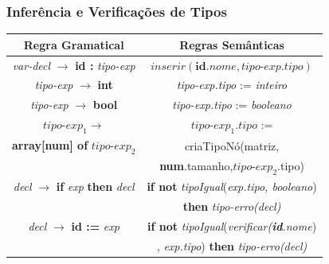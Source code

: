 \documentclass[table]{beamer}
\begin{document}
\begin{frame}
   \frametitle{Inferência e Verificações de Tipos}
   \begin{table}
      \begin{tabular}{c|c}
      \textbf{Regra Gramatical} & \textbf{Regras Semânticas} \\
      \hline
      \hline
      \textit{var-decl} $\to$ \textbf{id :} \textit{tipo-exp} & $inserir(\textbf{id}.nome, \textit{tipo-exp}.tipo)$ \\
      \hline
      \textit{tipo-exp} $\to$ \textbf{int} & \textit{tipo-exp.tipo} := \textit{inteiro} \\
      \hline
      \textit{tipo-exp} $\to$ \textbf{bool} & \textit{tipo-exp.tipo} := \textit{booleano} \\
      \hline
      $\textit{tipo-exp}_{1}\to$ & $\textit{tipo-exp}_{1}.tipo$ :=  \\
      \textbf{array[num] of} $\textit{tipo-exp}_{2}$ & criaTipoNó(matriz,\\
      & \textbf{num}.tamanho,$\textit{tipo-exp}_{2}$.tipo) \\
      \hline
      \textit{decl} $\to$ \textbf{if} \textit{exp} \textbf{then} \textit{decl} & \textbf{if not} \textit{tipoIgual}(\textit{exp.tipo, booleano}) \\
      & \textbf{then} \textit{tipo-erro(decl)} \\
      \hline
      \textit{decl} $\to$ \textbf{id :=} \textit{exp} & \textbf{if not} \textit{tipoIgual}(\textit{verificar(\textbf{id}.nome})\\
      & , \textit{exp.tipo}) \textbf{then} \textit{tipo-erro(decl)} \\
      \hline
      \end{tabular}
   \end{table}
\end{frame}
\end{document}
